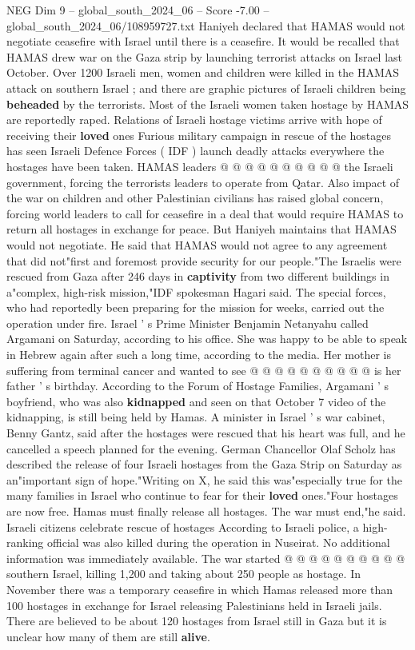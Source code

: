 \begin{textsample}{NEG Dim 9 – global\_south\_2024\_06 – Score -7.00 – global\_south\_2024\_06/108959727.txt}
Haniyeh declared that HAMAS would not negotiate ceasefire with Israel until there is a ceasefire.
It would be recalled that HAMAS drew war on the Gaza strip by launching terrorist attacks on Israel last October.
Over 1200 Israeli men, women and children were killed in the HAMAS attack on southern Israel ; and there are graphic pictures of Israeli children being \textbf{beheaded} by the terrorists.
Most of the Israeli women taken hostage by HAMAS are reportedly raped.
Relations of Israeli hostage victims arrive with hope of receiving their \textbf{loved} ones Furious military campaign in rescue of the hostages has seen Israeli Defence Forces ( IDF ) launch deadly attacks everywhere the hostages have been taken.
HAMAS leaders @ @ @ @ @ @ @ @ @ @ the Israeli government, forcing the terrorists leaders to operate from Qatar.
Also impact of the war on children and other Palestinian civilians has raised global concern, forcing world leaders to call for ceasefire in a deal that would require HAMAS to return all hostages in exchange for peace.
But Haniyeh maintains that HAMAS would not negotiate.
He said that HAMAS would not agree to any agreement that did not"first and foremost provide security for our people."The Israelis were rescued from Gaza after 246 days in \textbf{captivity} from two different buildings in a"complex, high-risk mission,"IDF spokesman Hagari said.
The special forces, who had reportedly been preparing for the mission for weeks, carried out the operation under fire.
Israel ' s Prime Minister Benjamin Netanyahu called Argamani on Saturday, according to his office.
She was happy to be able to speak in Hebrew again after such a long time, according to the media.
Her mother is suffering from terminal cancer and wanted to see @ @ @ @ @ @ @ @ @ @ is her father ' s birthday.
According to the Forum of Hostage Families, Argamani ' s boyfriend, who was also \textbf{kidnapped} and seen on that October 7 video of the kidnapping, is still being held by Hamas.
A minister in Israel ' s war cabinet, Benny Gantz, said after the hostages were rescued that his heart was full, and he cancelled a speech planned for the evening.
German Chancellor Olaf Scholz has described the release of four Israeli hostages from the Gaza Strip on Saturday as an"important sign of hope."Writing on X, he said this was"especially true for the many families in Israel who continue to fear for their \textbf{loved} ones."Four hostages are now free.
Hamas must finally release all hostages.
The war must end,"he said.
Israeli citizens celebrate rescue of hostages According to Israeli police, a high-ranking official was also killed during the operation in Nuseirat.
No additional information was immediately available.
The war started @ @ @ @ @ @ @ @ @ @ southern Israel, killing 1,200 and taking about 250 people as hostage.
In November there was a temporary ceasefire in which Hamas released more than 100 hostages in exchange for Israel releasing Palestinians held in Israeli jails.
There are believed to be about 120 hostages from Israel still in Gaza but it is unclear how many of them are still \textbf{alive}.

\end{textsample}
